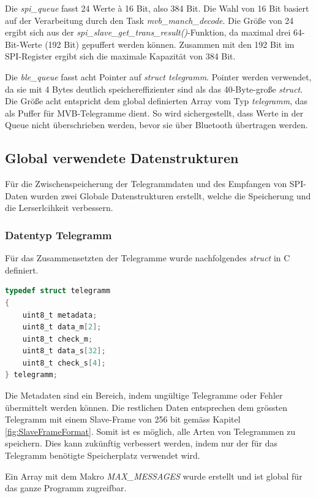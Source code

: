 Die \textit{spi\_queue} fasst 24 Werte à 16 Bit, also 384 Bit. Die Wahl von 16 Bit basiert auf der Verarbeitung durch den Task \textit{mvb\_manch\_decode}. Die Größe von 24 ergibt sich aus der \textit{spi\_slave\_get\_trans\_result()}-Funktion, da maximal drei 64-Bit-Werte (192 Bit) gepuffert werden können. Zusammen mit den 192 Bit im SPI-Register ergibt sich die maximale Kapazität von 384 Bit.

Die \textit{ble\_queue} fasst acht Pointer auf \textit{struct telegramm}. Pointer werden verwendet, da sie mit 4 Bytes deutlich speichereffizienter sind als das 40-Byte-große \textit{struct}. Die Größe acht entspricht dem global definierten Array vom Typ \textit{telegramm}, das als Puffer für MVB-Telegramme dient. So wird sichergestellt, dass Werte in der Queue nicht überschrieben werden, bevor sie über Bluetooth übertragen werden.

\subsection{Global verwendete Datenstrukturen}
\label{sub:GlobalDtatStruct}
Für die Zwischenspeicherung der Telegrammdaten und des Empfangen von SPI-Daten wurden zwei Globale Datenstrukturen erstellt, welche die Speicherung und die Lerserlcihkeit verbessern. 

\subsubsection{Datentyp Telegramm}
\label{subsub:DataTelegramm}
Für das Zusammensetzten der Telegramme wurde nachfolgendes \textit{struct} in C definiert.

\begin{lstlisting}[language=C]
typedef struct telegramm
{
    uint8_t metadata;
    uint8_t data_m[2];
    uint8_t check_m;
    uint8_t data_s[32];
    uint8_t check_s[4];
} telegramm;
\end{lstlisting}

Die Metadaten sind ein Bereich, indem ungültige Telegramme oder Fehler übermittelt werden können. Die restlichen Daten entsprechen dem grössten Telegramm mit einem Slave-Frame von 256 bit gemäss Kapitel \ref{fig:SlaveFrameFormat}. Somit ist es möglich, alle Arten von Telegrammen zu speichern. Dies kann zukünftig verbessert werden, indem nur der für das Telegramm benötigte Speicherplatz verwendet wird. 

Ein Array mit dem Makro \textit{MAX\_MESSAGES} wurde erstellt und ist global für das ganze Programm zugreifbar. 

